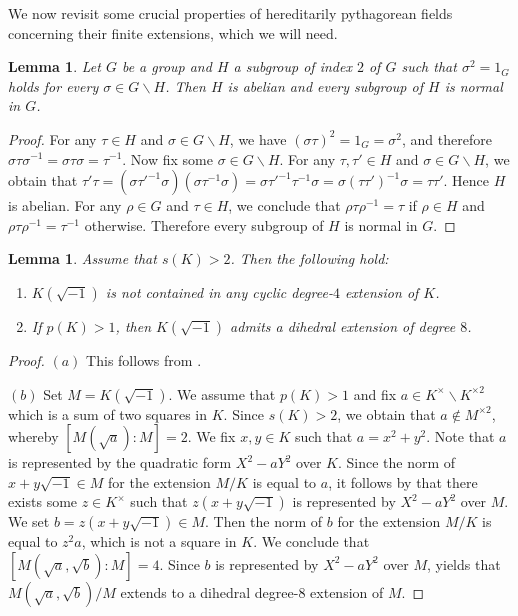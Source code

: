 \documentclass[12pt,leqno]{amsart}
\newcommand{\mg}[1]{#1^{\times}}
\newcommand{\sq}[1]{#1^{\times 2}}
\renewcommand{\setminus}{\smallsetminus}
\numberwithin{equation}{section}
\newtheorem{lem}[equation]{Lemma}
\theoremstyle{definition}
\theoremstyle{plain}
\begin{document}
We now revisit some crucial properties of hereditarily pythagorean fields concerning their finite extensions, which we will need.

\begin{lem}\label{L:groups}
Let $G$ be a group and $H$ a subgroup of index $2$ of $G$ such that $\sigma^2=1_G$ holds for every $\sigma\in G\setminus H$.
Then $H$ is abelian and every subgroup of $H$ is normal in $G$.
\end{lem}
\begin{proof}
For any $\tau\in H$ and $\sigma\in G\setminus H$, we have $(\sigma\tau)^2=1_G=\sigma^2$, and therefore $\sigma\tau\sigma^{-1}=\sigma\tau\sigma=\tau^{-1}$.
Now fix some $\sigma\in G\setminus H$. For any $\tau,\tau'\in H$ and $\sigma\in G\setminus H$, we obtain that
$\tau'\tau=(\sigma\tau'^{-1}\sigma)(\sigma\tau^{-1}\sigma)=\sigma\tau'^{-1}\tau^{-1}\sigma=\sigma(\tau\tau')^{-1}\sigma=\tau\tau'$.
Hence $H$ is abelian.
For any $\rho\in G$ and $\tau\in H$, we conclude that $\rho\tau\rho^{-1}=\tau$ if $\rho\in H$ and $\rho\tau\rho^{-1}=\tau^{-1}$ otherwise.
Therefore every subgroup of $H$ is normal in $G$.
\end{proof}


\begin{lem}\label{L:extensions}
Assume that $s(K)>2$. Then the following hold:
\begin{enumerate}[$(a)$]
    \item $K(\sqrt{-1})$ is not contained in any cyclic degree-$4$ extension of $K$.
    \item If $p(K)>1$, then $K(\sqrt{-1})$ admits a dihedral extension of degree $8$.
\end{enumerate}
\end{lem}
\begin{proof}
$(a)$ This follows from \cite[Theorem 2]{Kim90}.

$(b)$
Set $M=K(\sqrt{-1})$.
We assume that $p(K)>1$ and fix  $a\in\mg{K}\setminus\sq{K}$ which is a sum of two squares in $K$.
Since $s(K)>2$, we obtain that $a\notin\sq{M}$, whereby $[M(\sqrt{a}):M]=2$.
We fix $x,y\in K$ such that $a=x^2+y^2$.
Note that $a$ is represented by the quadratic form $X^2-aY^2$ over $K$.
Since the norm of $x+y\sqrt{-1}\in M$ for the extension $M/K$ is equal to $a$, it follows by \cite[Chap.~VII, Theorem 5.10]{Lam05} that there exists some $z\in \mg{K}$ such that
$z(x+y\sqrt{-1})$ is represented by $X^2-aY^2$ over $M$.
We set $b=z(x+y\sqrt{-1})\in M$. 
Then the norm of $b$ for the extension $M/K$ is equal to $z^2a$, which is not a square in $K$.
We conclude that 
$[M(\sqrt{a},\sqrt{b}):M]=4$.
Since $b$ is represented by $X^2-aY^2$ over $M$, \cite[Theorem 5]{Kim90} yields that  $M(\sqrt{a},\sqrt{b})/M$ extends to a dihedral degree-$8$ extension of $M$.
\end{proof}
\end{document}
